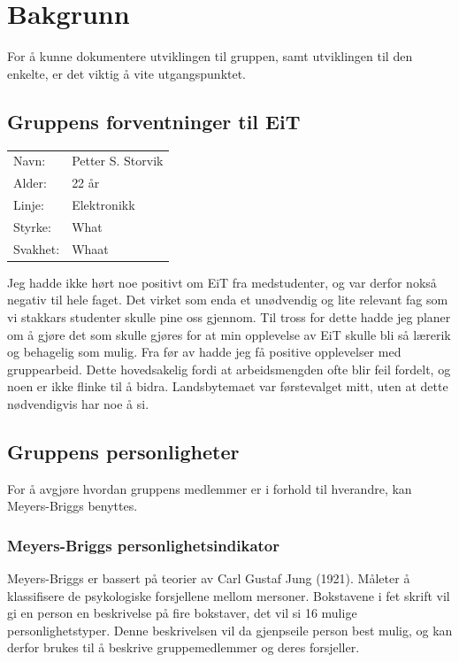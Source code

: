 \chapter{Bakgrunn}
For å kunne dokumentere utviklingen til gruppen, samt utviklingen til den enkelte, er det viktig å vite utgangspunktet.

\section{Gruppens forventninger til EiT}
\begin{table}[H]
    \begin{tabular}{l l}
        Navn: & Petter S. Storvik \\
        Alder: & 22 år \\ 
        Linje: & Elektronikk \\
        Styrke: & What \\
        Svakhet: & Whaat 
    \end{tabular}
\end{table}

Jeg hadde ikke hørt noe positivt om EiT fra medstudenter, og var derfor nokså negativ til hele faget. 
Det virket som enda et unødvendig og lite relevant fag som vi stakkars studenter skulle pine oss gjennom. 
Til tross for dette hadde jeg planer om å gjøre det som skulle gjøres for at min opplevelse av EiT skulle bli så lærerik og behagelig som mulig. 
Fra før av hadde jeg få positive opplevelser med gruppearbeid. 
Dette hovedsakelig fordi at arbeidsmengden ofte blir feil fordelt, og noen er ikke flinke til å bidra. 
Landsbytemaet var førstevalget mitt, uten at dette nødvendigvis har noe å si. 


\section{Gruppens personligheter}
For å avgjøre hvordan gruppens medlemmer er i forhold til hverandre, kan Meyers-Briggs benyttes.

\subsection{Meyers-Briggs personlighetsindikator}
Meyers-Briggs er bassert på teorier av Carl Gustaf Jung (1921).
Måleter å klassifisere de psykologiske forsjellene mellom mersoner.
Bokstavene i fet skrift vil gi en person en beskrivelse på fire bokstaver, det vil si 16 mulige personlighetstyper.
Denne beskrivelsen vil da gjenpseile person best mulig, og kan derfor brukes til å beskrive gruppemedlemmer og deres forsjeller.
\vspace{\secspace}

